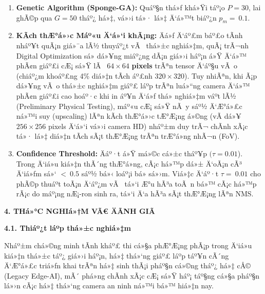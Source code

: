 \documentclass[]{article}
\begin{document}
\begin{enumerate}
\def\labelenumi{\arabic{enumi}.}
\item
  \textbf{Genetic Algorithm (Sponge-GA):} Quáº§n thá»ƒ khá»Ÿi táº¡o \(P = 30\),
  lai ghÃ©p qua \(G = 50\) tháº¿ há»‡, vá»›i tá»· lá»‡ Ä‘á»™t biáº¿n \(p_{m} = \ 0.1\).
\item
  \textbf{KÃ­ch thÆ°á»›c Máº«u Ä‘á»‘i khÃ¡ng:} Äá»ƒ Ä‘áº£m báº£o tÃ­nh nháº¥t quÃ¡n giá»¯a lÃ½
  thuyáº¿t vÃ  thá»±c nghiá»‡m, quÃ¡ trÃ¬nh Digital Optimization sá»­ dá»¥ng miáº¿ng dÃ¡n 
  giá»›i háº¡n á»Ÿ Ä‘á»™ phÃ¢n giáº£i cÆ¡ sá»Ÿ lÃ  \(64 \times 64\) \textbf{pixels} trÃªn 
  tensor Ä‘áº§u vÃ o (chiáº¿m khoáº£ng 4\% diá»‡n tÃ­ch áº£nh \(320 \times 320\)). Tuy 
  nhiÃªn, khi Ã¡p dá»¥ng vÃ o thá»±c nghiá»‡m giáº£ láº­p trÃªn luá»“ng camera Ä‘á»™ phÃ¢n 
  giáº£i cao hoáº·c khi in áº¥n Ä‘á»ƒ thá»­ nghiá»‡m váº­t lÃ½ (Preliminary Physical 
  Testing), máº«u cÆ¡ sá»Ÿ nÃ y sáº½ Ä‘Æ°á»£c ná»™i suy (upscaling) lÃªn kÃ­ch thÆ°á»›c 
  tÆ°Æ¡ng á»©ng (vÃ­ dá»¥ \(256 \times 256\) pixels Ä‘á»‘i vá»›i camera HD) nháº±m duy 
  trÃ¬ chÃ­nh xÃ¡c tá»· lá»‡ diá»‡n tÃ­ch sÃ¡t thÆ°Æ¡ng trÃªn trÆ°á»ng nhÃ¬n (FoV).
\item
  \textbf{Confidence Threshold:} Äáº·t á»Ÿ má»©c
  cá»±c tháº¥p \((\tau = 0.01\)). Trong Ä‘iá»u kiá»‡n thÃ´ng thÆ°á»ng, cÃ¡c há»™p dá»±
  Ä‘oÃ¡n cÃ³ Ä‘iá»ƒm sá»‘ \(< \ 0.5\) sáº½ bá»‹ loáº¡i bá» sá»›m. Viá»‡c Ä‘áº·t
  \(\tau = \ 0.01\) cho phÃ©p thuáº­t toÃ¡n Ä‘áº¿m vÃ  tá»‘i Æ°u hÃ³a toÃ n bá»™ cÃ¡c
  há»™p rÃ¡c do máº¡ng nÆ¡-ron sinh ra, tá»‘i Ä‘a hÃ³a sÃ¡t thÆ°Æ¡ng lÃªn NMS.
\end{enumerate}

\textbf{4. THá»°C NGHIá»†M VÃ€ ÄÃNH GIÃ}

\textbf{4.1. Thiáº¿t láº­p thá»±c nghiá»‡m}

Nháº±m chá»©ng minh tÃ­nh kháº£ thi cá»§a phÆ°Æ¡ng phÃ¡p trong Ä‘iá»u kiá»‡n thá»±c táº¿
giá»›i háº¡n, há»‡ thá»‘ng giáº£ láº­p táº¥n cÃ´ng Ä‘Æ°á»£c triá»ƒn khai trÃªn há»‡ sinh thÃ¡i
pháº§n cá»©ng tháº¿ há»‡ cÅ© (Legacy Edge-AI), mÃ´ phá»ng chÃ­nh xÃ¡c cÆ¡ sá»Ÿ háº¡ táº§ng
cá»§a pháº§n lá»›n cÃ¡c há»‡ thá»‘ng camera an ninh ná»™i bá»™ hiá»‡n nay.
\end{document}
